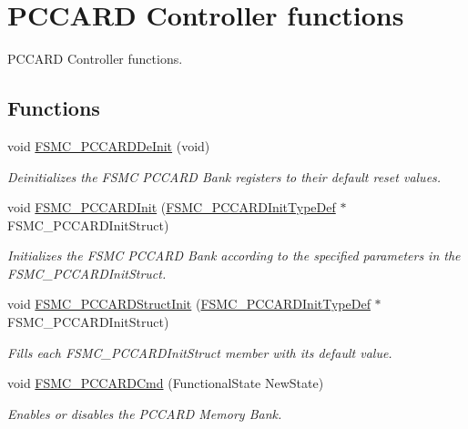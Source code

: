\hypertarget{group___f_s_m_c___group3}{\section{P\-C\-C\-A\-R\-D Controller functions}
\label{group___f_s_m_c___group3}
}


P\-C\-C\-A\-R\-D Controller functions.  


\subsection*{Functions}
\begin{DoxyCompactItemize}
\item 
void \hyperlink{group___f_s_m_c___group3_ga2f53ccf3a4f3c80a5a56fb47ccd47ccd}{F\-S\-M\-C\-\_\-\-P\-C\-C\-A\-R\-D\-De\-Init} (void)
\begin{DoxyCompactList}\small\item\em Deinitializes the F\-S\-M\-C P\-C\-C\-A\-R\-D Bank registers to their default reset values. \end{DoxyCompactList}\item 
void \hyperlink{group___f_s_m_c___group3_gacee1351363e7700a296faa1734a910aa}{F\-S\-M\-C\-\_\-\-P\-C\-C\-A\-R\-D\-Init} (\hyperlink{struct_f_s_m_c___p_c_c_a_r_d_init_type_def}{F\-S\-M\-C\-\_\-\-P\-C\-C\-A\-R\-D\-Init\-Type\-Def} $\ast$F\-S\-M\-C\-\_\-\-P\-C\-C\-A\-R\-D\-Init\-Struct)
\begin{DoxyCompactList}\small\item\em Initializes the F\-S\-M\-C P\-C\-C\-A\-R\-D Bank according to the specified parameters in the F\-S\-M\-C\-\_\-\-P\-C\-C\-A\-R\-D\-Init\-Struct. \end{DoxyCompactList}\item 
void \hyperlink{group___f_s_m_c___group3_ga7a64ba0e0545b3f1913c9d1d28c05e62}{F\-S\-M\-C\-\_\-\-P\-C\-C\-A\-R\-D\-Struct\-Init} (\hyperlink{struct_f_s_m_c___p_c_c_a_r_d_init_type_def}{F\-S\-M\-C\-\_\-\-P\-C\-C\-A\-R\-D\-Init\-Type\-Def} $\ast$F\-S\-M\-C\-\_\-\-P\-C\-C\-A\-R\-D\-Init\-Struct)
\begin{DoxyCompactList}\small\item\em Fills each F\-S\-M\-C\-\_\-\-P\-C\-C\-A\-R\-D\-Init\-Struct member with its default value. \end{DoxyCompactList}\item 
void \hyperlink{group___f_s_m_c___group3_ga2d410151ceb3428c6a1bf374a0472cde}{F\-S\-M\-C\-\_\-\-P\-C\-C\-A\-R\-D\-Cmd} (Functional\-State New\-State)
\begin{DoxyCompactList}\small\item\em Enables or disables the P\-C\-C\-A\-R\-D Memory Bank. \end{DoxyCompactList}\end{DoxyCompactItemize}


